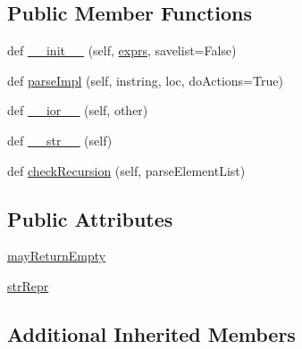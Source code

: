 \subsection*{Public Member Functions}
\begin{DoxyCompactItemize}
\item 
def \hyperlink{classsetuptools_1_1__vendor_1_1pyparsing_1_1MatchFirst_a8c4b94a7f8d215b1318450837ca995a7}{\+\_\+\+\_\+init\+\_\+\+\_\+} (self, \hyperlink{classsetuptools_1_1__vendor_1_1pyparsing_1_1ParseExpression_a4e2611e5f2c7118fb18cdc4a710bd3db}{exprs}, savelist=False)
\item 
def \hyperlink{classsetuptools_1_1__vendor_1_1pyparsing_1_1MatchFirst_aeac5a3aa6b8289f092a5f4fc3036f19e}{parse\+Impl} (self, instring, loc, do\+Actions=True)
\item 
def \hyperlink{classsetuptools_1_1__vendor_1_1pyparsing_1_1MatchFirst_a438540bf6ab18d10e6f87804e73a44cc}{\+\_\+\+\_\+ior\+\_\+\+\_\+} (self, other)
\item 
def \hyperlink{classsetuptools_1_1__vendor_1_1pyparsing_1_1MatchFirst_a4f868d0c5588bc60bc515a1d2e137c9b}{\+\_\+\+\_\+str\+\_\+\+\_\+} (self)
\item 
def \hyperlink{classsetuptools_1_1__vendor_1_1pyparsing_1_1MatchFirst_a5376c92c60f069f53e8ad95cebde5c79}{check\+Recursion} (self, parse\+Element\+List)
\end{DoxyCompactItemize}
\subsection*{Public Attributes}
\begin{DoxyCompactItemize}
\item 
\hyperlink{classsetuptools_1_1__vendor_1_1pyparsing_1_1MatchFirst_a2f6ed66c259a38cbabf228547c89e4c7}{may\+Return\+Empty}
\item 
\hyperlink{classsetuptools_1_1__vendor_1_1pyparsing_1_1MatchFirst_a78d1963e4344e706db983ccaa0aa3a2a}{str\+Repr}
\end{DoxyCompactItemize}
\subsection*{Additional Inherited Members}


